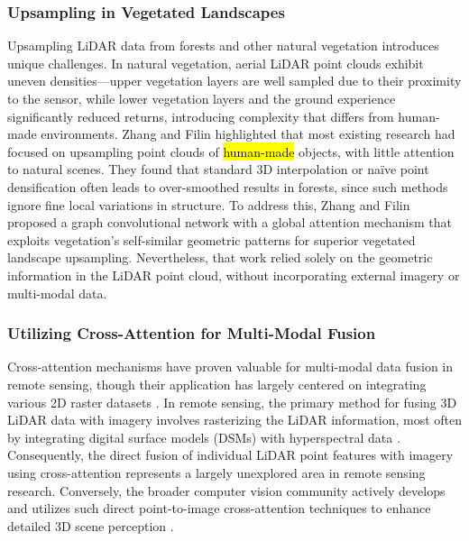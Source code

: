 \documentclass[remotesensing,article,accept,pdftex,moreauthors]{Definitions/mdpi}
\begin{document}
\subsubsection{Upsampling in Vegetated Landscapes}

Upsampling LiDAR data from forests and other natural vegetation introduces unique challenges. In natural vegetation, aerial LiDAR point clouds exhibit uneven densities—upper vegetation layers are well sampled due to their proximity to the sensor, while lower vegetation layers and the ground experience significantly reduced returns, introducing complexity that differs from human-made environments. Zhang and Filin \cite{zhang2022deep} highlighted that most existing research had focused on upsampling point clouds of \hl{human-made} objects, with little attention to natural scenes. They found that standard 3D interpolation or naïve point densification often leads to over-smoothed results in forests, since such methods ignore fine local variations in structure. To address this, Zhang and Filin proposed a graph convolutional network with a global attention mechanism that exploits vegetation's self-similar geometric patterns for superior vegetated landscape upsampling. Nevertheless, that work relied solely on the geometric information in the LiDAR point cloud, without incorporating external imagery or multi-modal data.

\subsubsection{Utilizing Cross-Attention for Multi-Modal Fusion}

Cross-attention mechanisms have proven valuable for multi-modal data fusion in remote sensing, though their application has largely centered on integrating various 2D raster datasets \cite{yan2025remote, ma2022crossmodal, qingyun2022cross, li2024cross}. In remote sensing, the primary method for fusing 3D LiDAR data with imagery involves rasterizing the LiDAR information, most often by integrating digital surface models (DSMs) with hyperspectral data \cite{yu2024dmsca, li2024multi, yang2024lidar}. Consequently, the direct fusion of individual LiDAR point features with imagery using cross-attention represents a largely unexplored area in remote sensing research. Conversely, the broader computer vision community actively develops and utilizes such direct point-to-image cross-attention techniques to enhance detailed 3D scene perception \cite{zhu2024cams, yoo20203d, wu2021point}.
\end{document}
